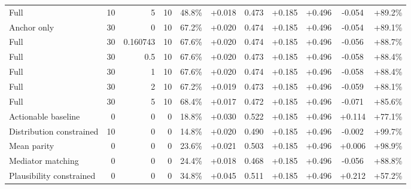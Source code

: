 \begin{table}[htbp]
\begin{tabular}{lrrrccccccc}
Full & 10 & 5 & 10 & 48.8\% & +0.018 & 0.473 & +0.185 & +0.496 & -0.054 & +89.2\% \\
Anchor only & 30 & 0 & 10 & 67.2\% & +0.020 & 0.474 & +0.185 & +0.496 & -0.054 & +89.1\% \\
Full & 30 & 0.160743 & 10 & 67.6\% & +0.020 & 0.474 & +0.185 & +0.496 & -0.056 & +88.7\% \\
Full & 30 & 0.5 & 10 & 67.6\% & +0.020 & 0.473 & +0.185 & +0.496 & -0.058 & +88.4\% \\
Full & 30 & 1 & 10 & 67.6\% & +0.020 & 0.474 & +0.185 & +0.496 & -0.058 & +88.4\% \\
Full & 30 & 2 & 10 & 67.2\% & +0.019 & 0.473 & +0.185 & +0.496 & -0.059 & +88.1\% \\
Full & 30 & 5 & 10 & 68.4\% & +0.017 & 0.472 & +0.185 & +0.496 & -0.071 & +85.6\% \\
Actionable baseline & 0 & 0 & 0 & 18.8\% & +0.030 & 0.522 & +0.185 & +0.496 & +0.114 & +77.1\% \\
Distribution constrained & 10 & 0 & 0 & 14.8\% & +0.020 & 0.490 & +0.185 & +0.496 & -0.002 & +99.7\% \\
Mean parity & 0 & 0 & 0 & 23.6\% & +0.021 & 0.503 & +0.185 & +0.496 & +0.006 & +98.9\% \\
Mediator matching & 0 & 0 & 0 & 24.4\% & +0.018 & 0.468 & +0.185 & +0.496 & -0.056 & +88.8\% \\
Plausibility constrained & 0 & 0 & 0 & 34.8\% & +0.045 & 0.511 & +0.185 & +0.496 & +0.212 & +57.2\% \\
\bottomrule
\end{tabular}
\end{table}